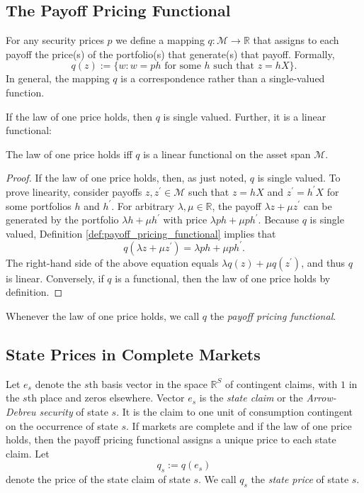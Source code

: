 \documentclass[\topdir/lecture\_notes.tex]{subfiles}
\begin{document}
\subsection{The Payoff Pricing Functional}
For any security prices $p$ we define a mapping $q: \mathcal{M} \rightarrow \mathbb{R}$ that assigns to each payoff the price(s) of the portfolio(s) that generate(s) that payoff. Formally,
\begin{equation}
q(z) :=\{w: w=p h \text { for some } h \text { such that } z=h X\}. \label{def:payoff_pricing_functional}
\end{equation}
In general, the mapping $q$ is a correspondence rather than a single-valued function.

If the law of one price holds, then $q$ is single valued. Further, it is a linear functional:
\begin{theorem}\label{thm:law_of_one_price_linearity}
The law of one price holds iff $q$ is a linear functional on the asset span $\mathcal{M}$.
\end{theorem}
\begin{proof}
If the law of one price holds, then, as just noted, $q$ is single valued. To prove linearity, consider payoffs $z, z^{\prime} \in \mathcal{M}$ such that $z=h X$ and $z^{\prime}=h^{\prime} X$ for some portfolios $h$ and $h^{\prime}$. For arbitrary $\lambda, \mu \in \mathbb{R}$, the payoff $\lambda z+\mu z^{\prime}$ can be generated by the portfolio $\lambda h+\mu h^{\prime}$ with price $\lambda p h+\mu p h^{\prime}$. Because $q$ is single valued, Definition \ref{def:payoff_pricing_functional} implies that
\begin{equation*}
q\left(\lambda z+\mu z^{\prime}\right)=\lambda p h+\mu p h^{\prime} . 
\end{equation*}
The right-hand side of the above equation equals $\lambda q(z)+\mu q\left(z^{\prime}\right)$, and thus $q$ is linear. Conversely, if $q$ is a functional, then the law of one price holds by definition.
\end{proof}

Whenever the law of one price holds, we call $q$ the \emph{payoff pricing functional}.

\subsection{State Prices in Complete Markets}
Let $e_{s}$ denote the $s$th basis vector in the space $\mathbb{R}^{S}$ of contingent claims, with $1$ in the $s$th place and zeros elsewhere. Vector $e_{s}$ is the \emph{state claim} or the \emph{Arrow-Debreu security} of state $s$. It is the claim to one unit of consumption contingent on the occurrence of state $s$. If markets are complete and if the law of one price holds, then the payoff pricing functional assigns a unique price to each state claim. Let
\begin{equation*}
q_{s} := q(e_{s})
\end{equation*}
denote the price of the state claim of state $s$. We call $q_{s}$ the \emph{state price} of state $s$.
\end{document}
